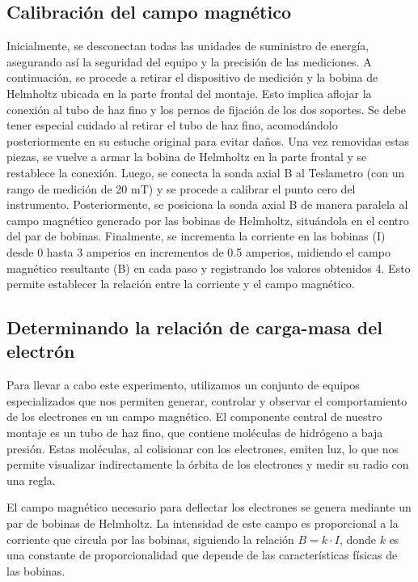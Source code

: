\documentclass[twocolumn,a4paper,11pt]{scrartcl}
\begin{document}
\subsection*{Calibración del campo magnético}
Inicialmente, se desconectan todas las unidades de suministro de energía, asegurando así la seguridad del equipo y la precisión de las mediciones. A continuación, se procede a retirar el dispositivo de medición y la bobina de Helmholtz ubicada en la parte frontal del montaje. Esto implica aflojar la conexión al tubo de haz fino y los pernos de fijación de los dos soportes. Se debe tener especial cuidado al retirar el tubo de haz fino, acomodándolo posteriormente en su estuche original para evitar daños. Una vez removidas estas piezas, se vuelve a armar la bobina de Helmholtz en la parte frontal y se restablece la conexión. 
Luego, se conecta la sonda axial B al Teslametro (con un rango de medición de 20 mT) y se procede a calibrar el punto cero del instrumento. Posteriormente, se posiciona la sonda axial B de manera paralela al campo magnético generado por las bobinas de Helmholtz, situándola en el centro del par de bobinas. Finalmente, se incrementa la corriente en las bobinas (I) desde 0 hasta 3 amperios en incrementos de 0.5 amperios, midiendo el campo magnético resultante (B) en cada paso y registrando los valores obtenidos 4. Esto permite establecer la relación entre la corriente y el campo magnético.


\subsection*{Determinando la relación de carga-masa del electrón}
Para llevar a cabo este experimento, utilizamos un conjunto de equipos especializados que nos permiten generar, controlar y observar el comportamiento de los electrones en un campo magnético. El componente central de nuestro montaje es un tubo de haz fino, que contiene moléculas de hidrógeno a baja presión. Estas moléculas, al colisionar con los electrones, emiten luz, lo que nos permite visualizar indirectamente la órbita de los electrones y medir su radio con una regla.

El campo magnético necesario para deflectar los electrones se genera mediante un par de bobinas de Helmholtz. La intensidad de este campo es proporcional a la corriente que circula por las bobinas, siguiendo la relación $B = k \cdot I$, donde $k$ es una constante de proporcionalidad que depende de las características físicas de las bobinas.
\end{document}
